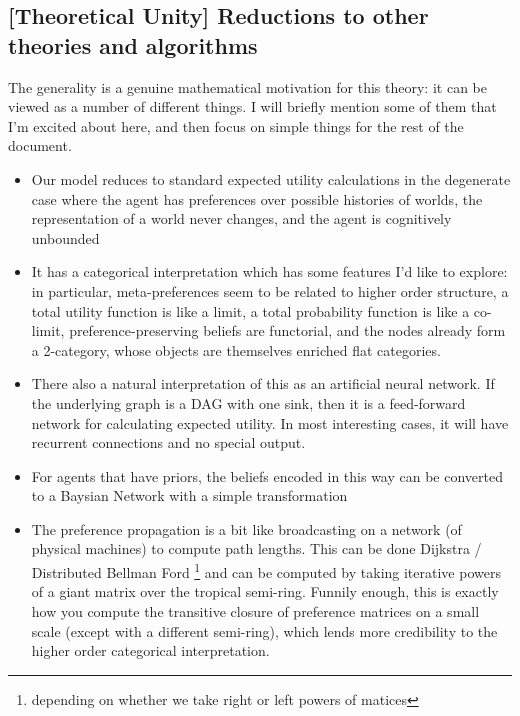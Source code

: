 \documentclass{article}
\begin{document}
	\subsection*{[Theoretical Unity] Reductions to other theories and algorithms} 
	The generality is a genuine mathematical motivation for this theory: it can be viewed as a number of different things. I will briefly mention some of them that I'm excited about here, and then focus on simple things for the rest of the document.
	\begin{itemize}[nosep]
		\item Our model reduces to standard expected utility calculations in the degenerate case where the agent has preferences over possible histories of worlds, the representation of a world never changes, and the agent is cognitively unbounded
		\item It has a categorical interpretation which has some features I'd like to explore: in particular, meta-preferences seem to be related to higher order structure, a total utility function is like a limit, a total probability function is like a co-limit, preference-preserving beliefs are functorial, and the nodes already form a 2-category, whose objects are themselves enriched flat categories.
		\item There also a natural interpretation of this as an artificial neural network. If the underlying graph is a DAG with one sink, then it is a feed-forward network for calculating expected utility. In most interesting cases, it will have recurrent connections and no special output.
		\item For agents that have priors, the beliefs encoded in this way can be converted to a Baysian Network with a simple transformation
		\item The preference propagation is a bit like broadcasting on a network (of physical machines) to compute path lengths. This can be done Dijkstra / Distributed Bellman Ford \footnote{depending on whether we take right or left powers of matices} and can be computed by taking iterative powers of a giant matrix over the tropical semi-ring. Funnily enough, this is exactly how you compute the transitive closure of preference matrices on a small scale (except with a different semi-ring), which lends more credibility to the higher order categorical interpretation.
	\end{itemize}
	
\end{document}
